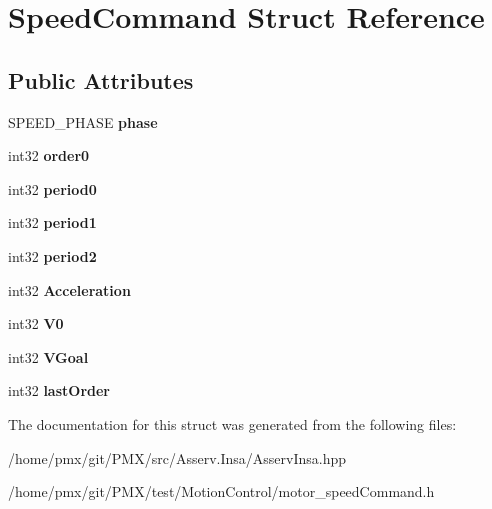 \hypertarget{structSpeedCommand}{}\section{Speed\+Command Struct Reference}
\label{structSpeedCommand}
\subsection*{Public Attributes}
\begin{DoxyCompactItemize}
\item 
\mbox{\label{structSpeedCommand_af7c4ea03af0937182d506f06b85c5212}} 
S\+P\+E\+E\+D\+\_\+\+P\+H\+A\+SE {\bfseries phase}
\item 
\mbox{\label{structSpeedCommand_a76adf31d80ee8203564fd74d2e83c766}} 
int32 {\bfseries order0}
\item 
\mbox{\label{structSpeedCommand_a304895b166e384e95678b9f3cdfdf622}} 
int32 {\bfseries period0}
\item 
\mbox{\label{structSpeedCommand_aa9f994d08e73f47d57240dedfdb4067d}} 
int32 {\bfseries period1}
\item 
\mbox{\label{structSpeedCommand_ae1d3c3fb225051cfb1c06bd4353cdcbb}} 
int32 {\bfseries period2}
\item 
\mbox{\label{structSpeedCommand_a6c6ade4b5e68785dc418e332fe1848ee}} 
int32 {\bfseries Acceleration}
\item 
\mbox{\label{structSpeedCommand_aaced416e66072bb6621dafff22beb759}} 
int32 {\bfseries V0}
\item 
\mbox{\label{structSpeedCommand_a7e38b56e5c960a209db046a899147ed6}} 
int32 {\bfseries V\+Goal}
\item 
\mbox{\label{structSpeedCommand_a1cac13a04c3b2e0addd3b470a822d4d9}} 
int32 {\bfseries last\+Order}
\end{DoxyCompactItemize}


The documentation for this struct was generated from the following files\+:\begin{DoxyCompactItemize}
\item 
/home/pmx/git/\+P\+M\+X/src/\+Asserv.\+Insa/Asserv\+Insa.\+hpp\item 
/home/pmx/git/\+P\+M\+X/test/\+Motion\+Control/motor\+\_\+speed\+Command.\+h\end{DoxyCompactItemize}
